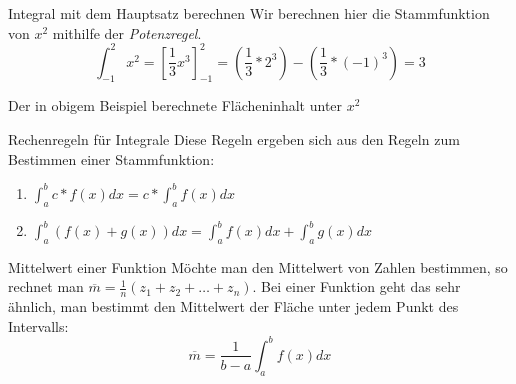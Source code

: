 \begin{bla}{Integral mit dem Hauptsatz berechnen}
  Wir berechnen hier die Stammfunktion von $x^2$ mithilfe der \emph{Potenzregel}.
  \begin{equation*}
    \int_{-1}^2 x^2={\left[\frac{1}{3}x^3\right]}_{-1}^2=\left(\frac{1}{3}*2^3\right)-\left(\frac{1}{3}*{(-1)}^3\right)=3
  \end{equation*}

  \begin{marginfigure}
    \caption{Der in obigem Beispiel berechnete Flächeninhalt unter $x^2$}
  \end{marginfigure}
\end{bla}

\begin{bla}{Rechenregeln für Integrale}
  Diese Regeln ergeben sich aus den Regeln zum Bestimmen einer Stammfunktion:
  \begin{enumerate}
    \item $\int_a^b c*f(x)dx = c*\int_a^b f(x)dx$
    \item $\int_a^b (f(x)+g(x))dx = \int_a^b f(x)dx + \int_a^b g(x)dx$
  \end{enumerate}
\end{bla}

\begin{bla}{Mittelwert einer Funktion}
  Möchte man den Mittelwert von Zahlen bestimmen, so rechnet man $\overline{m}=\frac{1}{n}(z_1+z_2+\dots+z_n)$. Bei einer Funktion geht das sehr ähnlich, man bestimmt den Mittelwert der Fläche unter jedem Punkt des Intervalls:
  \begin{equation*}
    \overline{m} = \frac{1}{b-a}\int_a^b f(x)dx
  \end{equation*}
\end{bla}



